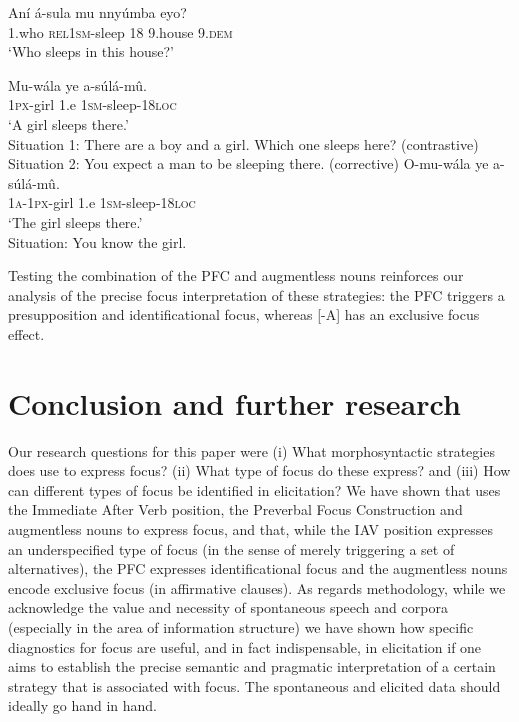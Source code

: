 \documentclass[output=paper]{langsci/langscibook}
\begin{document}
\ea\label{ex:vanderwal:42}
\ea\label{ex:vanderwal:42a}
\gll   Aní  á-sula      mu  nnyúmba  eyo?\\
       1.who  \textsc{rel1sm}-sleep  18  9.house  9.\textsc{dem}\\
\glt   ‘Who sleeps in this house?’


\ex\label{ex:vanderwal:42b}
\gll     Mu-wála  ye  a-súlá-mû.\\
         \textsc{1px}-girl  1.e  \textsc{1sm}-sleep-\textsc{18loc}\\
\glt ‘A girl sleeps there.’\\
Situation 1: There are a boy and a girl. Which one sleeps here? (contrastive)\\
Situation 2: You expect a man to be sleeping there. (corrective)
\ex\label{ex:vanderwal:42c}
\gll    O-mu-wála  ye  a-súlá-mû.\\
         \textsc{1a}-\textsc{1px}-girl  1.e  \textsc{1sm}-sleep-\textsc{18loc}\\
\glt ‘The girl sleeps there.’\\
Situation: You know the girl.
\z
\z

Testing the combination of the PFC and augmentless nouns reinforces our analysis of the precise focus interpretation of these strategies: the PFC triggers a presupposition and identificational focus, whereas [-A] has an exclusive focus effect.

\section{Conclusion and further research}\label{sec:vanderwal:6}

Our research questions for this paper were 
(i) What morphosyntactic strategies does  use to express focus? 
(ii) What type of focus do these express? 
and (iii) How can different types of focus be identified in elicitation? We have shown that  uses the Immediate After Verb position, the Preverbal Focus Construction and augmentless nouns to express focus, and that, while the IAV position expresses an underspecified type of focus (in the sense of merely triggering a set of alternatives), the PFC expresses identificational focus and the augmentless nouns encode exclusive focus (in affirmative clauses). As regards methodology, while we acknowledge the value and necessity of spontaneous speech and corpora (especially in the area of information structure) we have shown how specific diagnostics for focus are useful, and in fact indispensable, in elicitation if one aims to establish the precise semantic and pragmatic interpretation of a certain strategy that is associated with focus. The spontaneous and elicited data should ideally go hand in hand.
\end{document}
